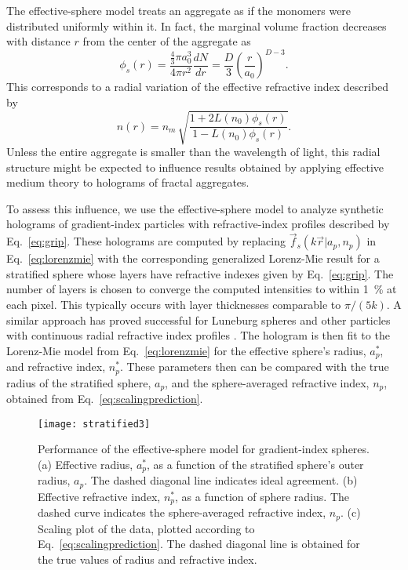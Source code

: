 The effective-sphere model 
treats an aggregate as if the monomers were distributed uniformly
within it.
In fact, the marginal volume fraction decreases with distance $r$ 
from the center of the aggregate as
\begin{equation}
  \label{eq:surfacevolumefraction}
  \phi_s(r) = \frac{\frac{4}{3} \pi a_0^3}{4 \pi r^2} \frac{dN}{dr}
  =  \frac{D}{3} \left( \frac{r}{a_0} \right)^{D - 3} .
\end{equation}
This corresponds to a radial variation of the effective refractive index
described by
\begin{equation}
  \label{eq:grip}
  n(r) = n_m \, \sqrt{\frac{1 + 2 L(n_0) \phi_s(r)}{1 - L(n_0) \phi_s(r)}}.
\end{equation}
Unless the entire aggregate is smaller than the wavelength of light,
this radial structure might be expected to influence results 
obtained by applying effective medium theory to holograms of fractal aggregates.

To assess this influence,
we use the effective-sphere model to analyze synthetic holograms
of gradient-index particles with refractive-index profiles
described by Eq.~\eqref{eq:grip}.
These holograms are computed by replacing
$\vec{f}_s(k\vec{r}\vert a_p, n_p)$ in
Eq.~\eqref{eq:lorenzmie} 
with the corresponding generalized Lorenz-Mie 
result for a stratified sphere \cite{yang03,pena09,gouesbet11}
whose layers have refractive indexes given by Eq.~\eqref{eq:grip}.
The number of layers is chosen to converge the computed intensities
to within \SI{1}{\percent} at each pixel.
This typically occurs with layer thicknesses comparable
to $\pi / (5 k)$.
A similar approach has proved successful for Luneburg spheres
and other particles with continuous radial refractive index profiles
\cite{selmke15}.
The hologram is then fit to the Lorenz-Mie model
from Eq.~\eqref{eq:lorenzmie} for the effective sphere's radius,
$a_p^\ast$, and refractive index, $n_p^\ast$.
These parameters then can be compared with the true radius of
the stratified sphere, $a_p$, and the sphere-averaged refractive
index, $n_p$,
obtained from Eq.~\eqref{eq:scalingprediction}.

\begin{figure}[!t]
  \centering
  \texttt{[image: stratified3]}
  \caption[Effective-sphere model for gradient-index spheres]
  {Performance of the effective-sphere model for
    gradient-index spheres.
    (a) Effective radius, $a_p^\ast$, as a function of the stratified
    sphere's outer radius, $a_p$.  The dashed diagonal line
    indicates ideal agreement.
    (b) Effective refractive index, $n_p^\ast$, as a function of
    sphere radius.  The dashed curve indicates the sphere-averaged
    refractive index, $n_p$.
    (c) Scaling plot of the data, plotted according to
    Eq.~\eqref{eq:scalingprediction}.  The dashed diagonal
    line is obtained for the true values of radius and refractive
    index.}
  \label{fig:stratified}
\end{figure}

